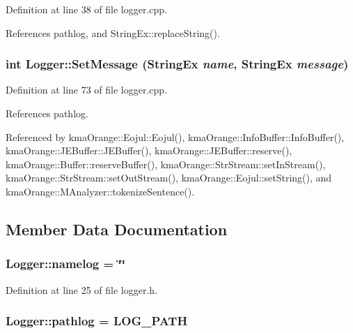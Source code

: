 Definition at line 38 of file logger.cpp.

References pathlog, and StringEx::replaceString().\hypertarget{classkmaOrange_1_1Logger_c80cafebd5d6501fb52a052ebe355293}{
\subsubsection[{SetMessage}]{\setlength{\rightskip}{0pt plus 5cm}int Logger::SetMessage ({\bf StringEx} {\em name}, \/  {\bf StringEx} {\em message})}}
\label{classkmaOrange_1_1Logger_c80cafebd5d6501fb52a052ebe355293}




Definition at line 73 of file logger.cpp.

References pathlog.

Referenced by kmaOrange::Eojul::Eojul(), kmaOrange::InfoBuffer::InfoBuffer(), kmaOrange::JEBuffer::JEBuffer(), kmaOrange::JEBuffer::reserve(), kmaOrange::Buffer::reserveBuffer(), kmaOrange::StrStream::setInStream(), kmaOrange::StrStream::setOutStream(), kmaOrange::Eojul::setString(), and kmaOrange::MAnalyzer::tokenizeSentence().

\subsection{Member Data Documentation}
\hypertarget{classkmaOrange_1_1Logger_80b6d6d721c122c8e5727eed64a9f0d6}{
\subsubsection[{namelog}]{ {\bf Logger::namelog} = \char`\"{}\char`\"{}}}
\label{classkmaOrange_1_1Logger_80b6d6d721c122c8e5727eed64a9f0d6}




Definition at line 25 of file logger.h.\hypertarget{classkmaOrange_1_1Logger_4b0f42b5917a47a7c6cc171b9b74219a}{
\subsubsection[{pathlog}]{ {\bf Logger::pathlog} = LOG\_\-PATH}}
\label{classkmaOrange_1_1Logger_4b0f42b5917a47a7c6cc171b9b74219a}




